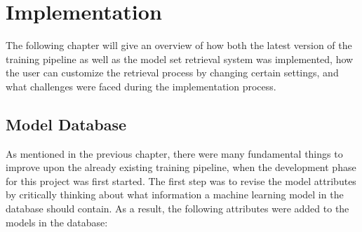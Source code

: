 \chapter{Implementation}\label{chap:implementation}

The following chapter will give an overview of how both the latest version of the training pipeline as well as the model set retrieval system was implemented, how the user can customize the retrieval process by changing certain settings, and what challenges were faced during the implementation process.



\section{Model Database}

As mentioned in the previous chapter, there were many fundamental things to improve upon the already existing training pipeline, when the development phase for this project was first started. The first step was to revise the model attributes by critically thinking about what information a machine learning model in the database should contain. As a result, the following attributes were added to the models in the database:

